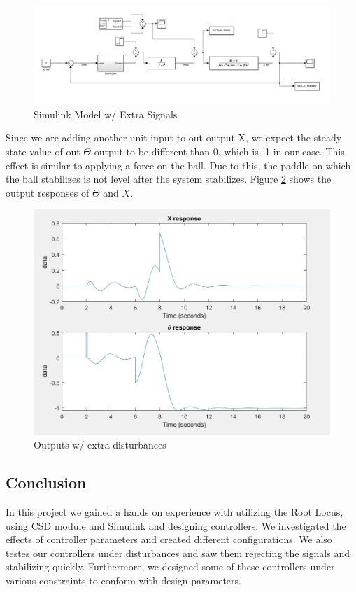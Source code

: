 \begin{figure}[H]
    \centering
    \includegraphics[width=.7\textwidth]{images/2dist.jpeg}
    \caption{Simulink Model w/ Extra Signals}
    \label{fig:2simu}
\end{figure}
Since we are adding another unit input to out output X, we expect the steady state value of out $\Theta$ output to be different than 0, which is -1 in our case. This effect is similar to applying a force on the ball. Due to this, the paddle on which the ball stabilizes is not level after the system stabilizes. Figure \ref{fig:out_dist} shows the output responses of $\Theta$ and $X$.

\begin{figure}[H]
    \centering
    \includegraphics[width=.7\textwidth]{images/2distresp.jpeg}
    \caption{Outputs w/ extra disturbances}
    \label{fig:out_dist}
\end{figure}



\subsection{Conclusion}

In this project we gained a hands on experience with utilizing the Root Locus, using CSD module and Simulink and designing controllers. We investigated the effects of controller parameters and created different configurations. We also testes our controllers under disturbances and saw them rejecting the signals and stabilizing quickly. Furthermore, we designed some of these controllers under various constraints to conform with design parameters.